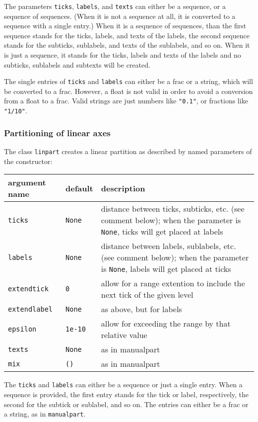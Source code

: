 The parameters \verb|ticks|, \verb|labels|, and \verb|texts| can
either be a sequence, or a sequence of sequences. (When it is not a
sequence at all, it is converted to a sequence with a single entry.)
When it is a sequence of sequences, than the first sequence stands for
the ticks, labels, and texts of the labels, the second sequence stands
for the subticks, sublabels, and texts of the sublabels, and so on.
When it is just a sequence, it stands for the ticks, labels and texts
of the labels and no subticks, sublabels and subtexts will be created.

The single entries of \verb|ticks| and \verb|labels| can either be a
frac or a string, which will be converted to a frac. However, a float
is not valid in order to avoid a conversion from a float to a frac.
Valid strings are just numbers like \verb|"0.1"|, or fractions like
\verb|"1/10"|.

\subsubsection{Partitioning of linear axes}

The class \verb|linpart| creates a linear partition as described by
named parameters of the constructor:

\medskip
\begin{tabularx}{\linewidth}{ll>{\raggedright\arraybackslash}X}
argument name&default&description\\
\hline
\texttt{ticks}&\texttt{None}&distance between ticks, subticks, etc. (see comment below); when the parameter is \texttt{None}, ticks will get placed at labels\\
\texttt{labels}&\texttt{None}&distance between labels, sublabels, etc. (see comment below); when the parameter is \texttt{None}, labels will get placed at ticks\\
\texttt{extendtick}&\texttt{0}&allow for a range extention to include the next tick of the given level\\
\texttt{extendlabel}&\texttt{None}&as above, but for labels\\
\texttt{epsilon}&\texttt{1e-10}&allow for exceeding the range by that relative value\\
\texttt{texts}&\texttt{None}&as in manualpart\\
\texttt{mix}&\texttt{()}&as in manualpart\\
\end{tabularx}
\medskip

The \verb|ticks| and \verb|labels| can either be a sequence or just a
single entry. When a sequence is provided, the first entry stands for
the tick or label, respectively, the second for the subtick or
sublabel, and so on. The entries can either be a frac or a string,
as in \verb|manualpart|.

